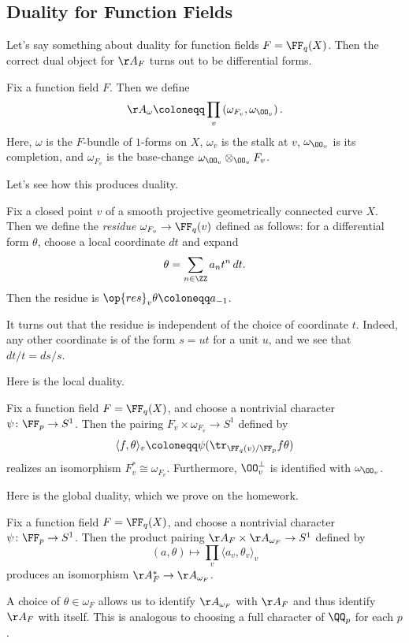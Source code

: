 \documentclass[../notes.tex]{subfiles}
\begin{document}
\subsection{Duality for Function Fields}
Let's say something about duality for function fields $F=\FF_q(X)$. Then the correct dual object for $\AA_F$ turns out to be differential forms.
\begin{notation}
	Fix a function field $F$. Then we define
	\[\AA_\omega\coloneqq\prod_v\left(\omega_{F_v},\omega_{\OO_v}\right).\]
	Here, $\omega$ is the $F$-bundle of $1$-forms on $X$, $\omega_v$ is the stalk at $v$, $\omega_{\OO_v}$ is its completion, and $\omega_{F_v}$ is the base-change $\omega_{\OO_v}\otimes_{\OO_v}F_v$.
\end{notation}
Let's see how this produces duality.
\begin{definition}[residue]
	Fix a closed point $v$ of a smooth projective geometrically connected curve $X$. Then we define the \textit{residue} $\omega_{F_v}\to\FF_q(v)$ defined as follows: for a differential form $\theta$, choose a local coordinate $dt$ and expand
	\[\theta=\sum_{n\in\ZZ}a_nt^n\,dt.\]
	Then the residue is $\op{res}_v\theta\coloneqq a_{-1}$.
\end{definition}
\begin{remark}
	It turns out that the residue is independent of the choice of coordinate $t$. Indeed, any other coordinate is of the form $s=ut$ for a unit $u$, and we see that $dt/t=ds/s$.
\end{remark}
Here is the local duality.
\begin{proposition}
	Fix a function field $F=\FF_q(X)$, and choose a nontrivial character $\psi\colon\FF_p\to S^1$. Then the pairing $F_v\times\omega_{F_v}\to S^1$ defined by
	\[\langle f,\theta\rangle_v\coloneqq\psi(\tr_{\FF_q(v)/\FF_p}f\theta)\]
	realizes an isomorphism $F_v^*\cong\omega_{F_v}$. Furthermore, $\OO_v^\perp$ is identified with $\omega_{\OO_v}$.
\end{proposition}
Here is the global duality, which we prove on the homework.
\begin{proposition}
	Fix a function field $F=\FF_q(X)$, and choose a nontrivial character $\psi\colon\FF_p\to S^1$. Then the product pairing $\AA_F\times\AA_{\omega_F}\to S^1$ defined by
	\[(a,\theta)\mapsto\prod_v\langle a_v,\theta_v\rangle_v\]
	produces an isomorphism $\AA_F^*\to\AA_{\omega_F}$.
\end{proposition}
\begin{remark}
	A choice of $\theta\in\omega_F$ allows us to identify $\AA_{\omega_F}$ with $\AA_F$ and thus identify $\AA_F$ with itself. This is analogous to choosing a full character of $\QQ_p$ for each $p$.
\end{remark}
\end{document}
